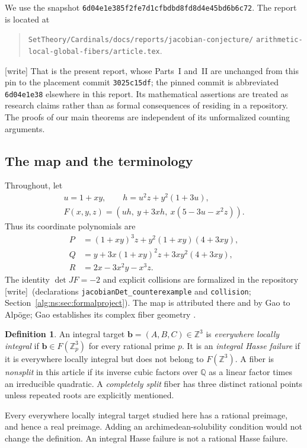 \documentclass[11pt]{article}
\numberwithin{equation}{section}
\theoremstyle{plain}
\theoremstyle{plain}
\theoremstyle{plain}
\theoremstyle{definition}
\newtheorem{definition}[definition]{Definition}
\theoremstyle{definition}
\theoremstyle{definition}
\theoremstyle{remark}
\newcommand{\Z}{\mathbb Z}\newcommand{\Q}{\mathbb Q}
\newcommand{\target}{\boldsymbol b}
\newcommand{\wtag}{\textup{[write]}}%
\newcommand{\rpath}[1]{\nolinkurl{#1}}
\newcommand{\nssha}{\nolinkurl{6d04e1e385f2fe7d1cfbdbd8fd8d4e45bd6b6c72}}
\begin{document}
We use the snapshot \nssha. The report is located at
\begin{quote}\small\raggedright
\rpath{SetTheory/Cardinals/docs/reports/jacobian-conjecture/}\allowbreak
\rpath{arithmetic-local-global-fibers/article.tex}.
\end{quote}
\wtag{} That is the present report, whose Parts~I and~II are unchanged
from this pin to the placement commit \texttt{3025c15df}; the pinned
commit is abbreviated \texttt{6d04e1e38} elsewhere in this report.
Its mathematical assertions are treated as research claims rather than
as formal consequences of residing in a repository. The proofs of our
main theorems are independent of its unformalized counting arguments.

\subsection{The map and the terminology}
Throughout, let
\begin{equation}\label{alg:ns:eq:F}
\begin{gathered}
u=1+xy,\qquad h=u^2z+y^2(1+3u),\\
F(x,y,z)=(uh,\ y+3xh,\ x(5-3u-x^2z)).
\end{gathered}
\end{equation}
Thus its coordinate polynomials are
\begin{align*}
P&=(1+xy)^3z+y^2(1+xy)(4+3xy),\\
Q&=y+3x(1+xy)^2z+3xy^2(4+3xy),\\
R&=2x-3x^2y-x^3z.
\end{align*}
The identity $\det JF=-2$ and explicit collisions are formalized in the
repository \cite{dh:proveitformal} \wtag{}~(declarations
\texttt{jacobianDet\_counterexample} and \texttt{collision};
Section~\ref{alg:ns:sec:formalproject}). The map is attributed there and by Gao to
Alp\"oge; Gao establishes its complex fiber geometry \cite{gao}.

\begin{definition}
An integral target $\target=(A,B,C)\in\Z^3$ is \emph{everywhere locally
integral} if $\target\in F(\Z_p^3)$ for every rational prime $p$.
It is an \emph{integral Hasse failure} if it is everywhere locally integral
but does not belong to $F(\Z^3)$. A fiber is \emph{nonsplit} in this article
if its inverse cubic factors over $\Q$ as a linear factor times an
irreducible quadratic. A \emph{completely split} fiber has three distinct
rational points unless repeated roots are explicitly mentioned.
\end{definition}
Every everywhere locally integral target studied here has a rational
preimage, and hence a real preimage. Adding an archimedean-solubility
condition would not change the definition. An integral Hasse failure is
not a rational Hasse failure.
\end{document}
